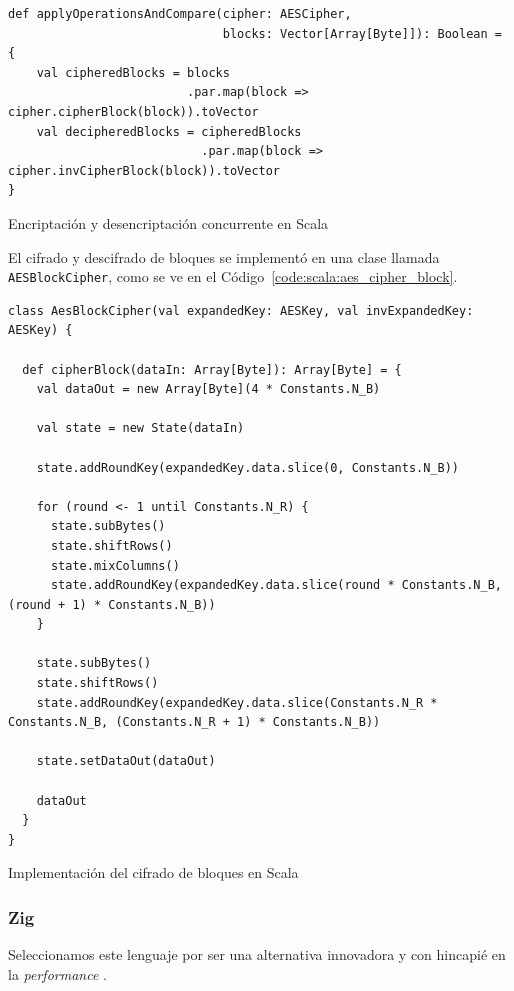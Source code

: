 \documentclass[11pt]{article}
\let\Oldsubsubsection\subsubsection
\renewcommand{\subsubsection}{\FloatBarrier\Oldsubsubsection}
\newcommand{\english}[1]{\textit{#1}}
\begin{document}
\begin{listing}[h]
\begin{verbatim}
def applyOperationsAndCompare(cipher: AESCipher,
                              blocks: Vector[Array[Byte]]): Boolean = {
    val cipheredBlocks = blocks
                         .par.map(block => cipher.cipherBlock(block)).toVector
    val decipheredBlocks = cipheredBlocks
                           .par.map(block => cipher.invCipherBlock(block)).toVector
}
\end{verbatim}
\caption{Encriptación y desencriptación concurrente en Scala}
\label{code:scala:aes_concurrent}
\end{listing}

El cifrado y descifrado de bloques se implementó en una clase llamada \lstinline{AESBlockCipher}, como se ve en el Código~\ref{code:scala:aes_cipher_block}.

\begin{listing}[h]
\begin{verbatim}
class AesBlockCipher(val expandedKey: AESKey, val invExpandedKey: AESKey) {

  def cipherBlock(dataIn: Array[Byte]): Array[Byte] = {
    val dataOut = new Array[Byte](4 * Constants.N_B)

    val state = new State(dataIn)

    state.addRoundKey(expandedKey.data.slice(0, Constants.N_B))

    for (round <- 1 until Constants.N_R) {
      state.subBytes()
      state.shiftRows()
      state.mixColumns()
      state.addRoundKey(expandedKey.data.slice(round * Constants.N_B, (round + 1) * Constants.N_B))
    }

    state.subBytes()
    state.shiftRows()
    state.addRoundKey(expandedKey.data.slice(Constants.N_R * Constants.N_B, (Constants.N_R + 1) * Constants.N_B))

    state.setDataOut(dataOut)

    dataOut
  }
}
\end{verbatim}
\caption{Implementación del cifrado de bloques en Scala}
\label{code:scala:aes_cipher_block}
\end{listing}

\subsubsection{Zig}

Seleccionamos este lenguaje por ser una alternativa innovadora y con hincapié en la \english{performance} \cite{zig:ex:zig_in_100_sec}.
\end{document}
